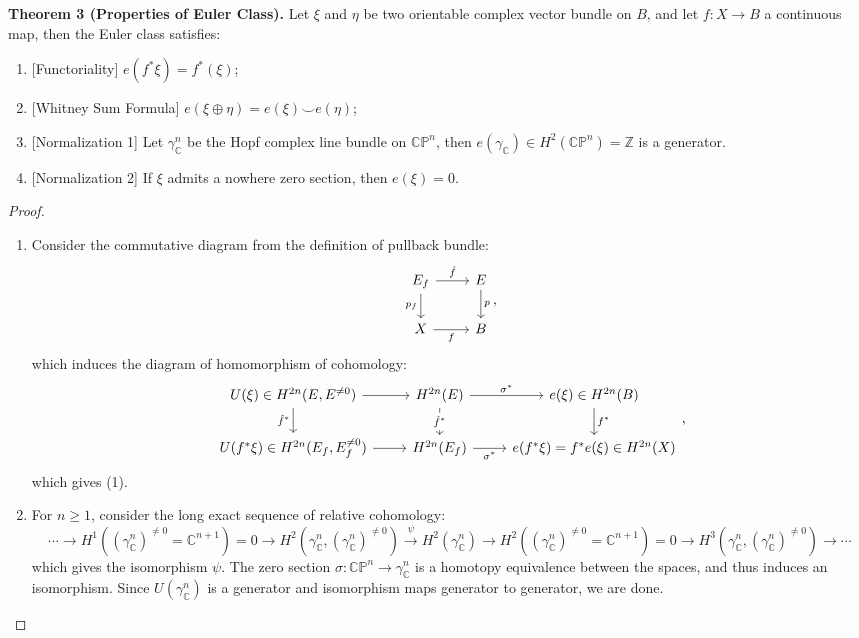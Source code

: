 \documentclass[10pt]{article}
\begin{document}
\colorbox{red!30}{\textbf{Theorem 3 (Properties of Euler Class).}} Let $\xi$ and $\eta$ be two orientable complex vector bundle on $B$, and let $f:X\to B$ a continuous map, then the Euler class satisfies:
\begin{enumerate}
\item {} [Functoriality] $e(f^*\xi)=f^*(\xi)$;
\item {} [Whitney Sum Formula] $e(\xi\oplus\eta)=e(\xi)\smile e(\eta)$;
\item {} [Normalization 1]
Let $\gamma^n_\mathbb{C}$ be the Hopf complex line bundle on $\mathbb{CP}^n$, then $e(\gamma_\mathbb{C})\in H^2(\mathbb{CP}^n)=\mathbb{Z}$ is a generator.
\item {} [Normalization 2]
If $\xi$ admits a nowhere zero section, then $e(\xi)=0$.
\end{enumerate}
\begin{proof}{}\leavevmode{}
\begin{enumerate}
\item
Consider the commutative diagram from the definition of pullback bundle:
$$
\begin{tikzcd}
E_f \arrow[r, "\hat{f}"] \arrow[d, "p_f"'] & E \arrow[d, "p"] \\
X \arrow[r, "f"']                          & B
\end{tikzcd},
$$
which induces the diagram of homomorphism of cohomology:
$$
\begin{tikzcd}
{U(\xi)\in H^{2n}(E,E^{\neq0})} \arrow[r] \arrow[d, "\hat{f}^*"'] & H^{2n}(E) \arrow[r, "\sigma^*"] \arrow[d, "\hat{f}^*" description] & e(\xi)\in H^{2n}(B) \arrow[d, "f^*"] \\
{U(f^*\xi)\in H^{2n}(E_f,E_f^{\neq0})} \arrow[r]                  & H^{2n}(E_f) \arrow[r, "\sigma^*"']                                 & e(f^*\xi)=f^*e(\xi)\in H^{2n}(X)
\end{tikzcd},
$$
which gives (1).
\item
For $n\geq1$, consider the long exact sequence of relative cohomology:
$$\cdots\to H^1((\gamma^n_\mathbb{C})^{\neq0}=\mathbb{C}^{n+1})=0\to H^2(\gamma^n_\mathbb{C},(\gamma^n_\mathbb{C})^{\neq0})\overset{\psi}{\to} H^2(\gamma^n_\mathbb{C})\to H^2((\gamma^n_\mathbb{C})^{\neq0}=\mathbb{C}^{n+1})=0\to H^3(\gamma^n_\mathbb{C},(\gamma^n_\mathbb{C})^{\neq0})\to\cdots$$
which gives the isomorphism $\psi$. The zero section $\sigma:\mathbb{CP}^n\to\gamma^n_\mathbb{C}$ is a homotopy equivalence between the spaces, and thus induces an isomorphism. Since $U(\gamma^n_\mathbb{C})$ is a generator and isomorphism maps generator to generator, we are done.

\end{enumerate}
\end{proof}
\end{document}
